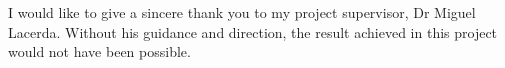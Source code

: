 \documentclass[
11pt,
oneside,
english,
singlespacing,
headsepline,
]{MastersDoctoralThesis}
\begin{document}

\begin{acknowledgements}
\addchaptertocentry{\acknowledgementname} %
I would like to give a sincere thank you to my project supervisor, Dr Miguel Lacerda. Without his guidance and direction, the result achieved in this project would not have been possible.
\end{acknowledgements}


\tableofcontents %

\listoffigures %

\listoftables %


\mainmatter %

\pagestyle{thesis} %



% 

% 
% 
% 
% 
% 
%
% 
% 



\appendix %


% 
% 
%


\printbibliography[heading=bibintoc]

\end{document}
